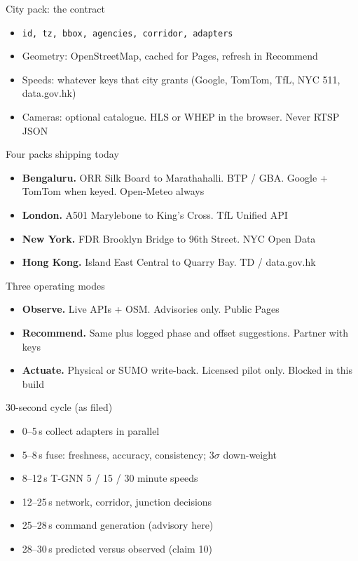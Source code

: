 \documentclass[aspectratio=169,11pt]{beamer}
\begin{document}
\begin{frame}{City pack: the contract}
\begin{itemize}\itemsep0.7em
\item \texttt{id, tz, bbox, agencies, corridor, adapters}
\item Geometry: OpenStreetMap, cached for Pages, refresh in Recommend
\item Speeds: whatever keys that city grants (Google, TomTom, TfL, NYC 511,
      data.gov.hk)
\item Cameras: optional catalogue. HLS or WHEP in the browser. Never RTSP JSON
\end{itemize}
\end{frame}

\begin{frame}{Four packs shipping today}
\begin{itemize}\itemsep0.7em
\item \textbf{Bengaluru.} ORR Silk Board to Marathahalli. BTP / GBA.
      Google + TomTom when keyed. Open-Meteo always
\item \textbf{London.} A501 Marylebone to King's Cross. TfL Unified API
\item \textbf{New York.} FDR Brooklyn Bridge to 96th Street. NYC Open Data
\item \textbf{Hong Kong.} Island East Central to Quarry Bay. TD / data.gov.hk
\end{itemize}
\end{frame}

\begin{frame}{Three operating modes}
\begin{itemize}\itemsep0.9em
\item \textbf{Observe.} Live APIs + OSM. Advisories only. Public Pages
\item \textbf{Recommend.} Same plus logged phase and offset suggestions.
      Partner with keys
\item \textbf{Actuate.} Physical or SUMO write-back. Licensed pilot only.
      Blocked in this build
\end{itemize}
\end{frame}

\begin{frame}{30-second cycle (as filed)}
\begin{itemize}\itemsep0.55em
\item 0--5\,s collect adapters in parallel
\item 5--8\,s fuse: freshness, accuracy, consistency; 3$\sigma$ down-weight
\item 8--12\,s T-GNN 5 / 15 / 30 minute speeds
\item 12--25\,s network, corridor, junction decisions
\item 25--28\,s command generation (advisory here)
\item 28--30\,s predicted versus observed (claim 10)
\end{itemize}
\end{frame}
\end{document}
